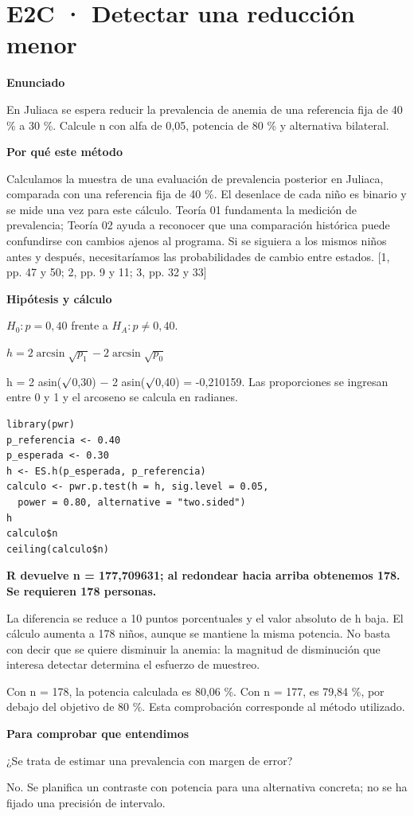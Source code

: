 \documentclass[10pt,a4paper]{article}
\newcommand{\etiqueta}[1]{\par{\bfseries\color{Blue}#1}\par}
\newcommand{\cajares}[1]{\par\colorbox{Pale}{\parbox{\dimexpr\linewidth-2\fboxsep}{\vspace{4pt}\textbf{\color{Navy}#1}\vspace{4pt}}}\par}
\begin{document}
\section*{E2C · Detectar una reducción menor}
\etiqueta{Enunciado}
En Juliaca se espera reducir la prevalencia de anemia de una referencia fija de 40 \% a 30 \%. Calcule n con alfa de 0,05, potencia de 80 \% y alternativa bilateral.
\etiqueta{Por qué este método}
Calculamos la muestra de una evaluación de prevalencia posterior en Juliaca, comparada con una referencia fija de 40 \%. El desenlace de cada niño es binario y se mide una vez para este cálculo. Teoría 01 fundamenta la medición de prevalencia; Teoría 02 ayuda a reconocer que una comparación histórica puede confundirse con cambios ajenos al programa. Si se siguiera a los mismos niños antes y después, necesitaríamos las probabilidades de cambio entre estados. [1, pp. 47 y 50; 2, pp. 9 y 11; 3, pp. 32 y 33]
\etiqueta{Hipótesis y cálculo}
$H_0:p=0{,}40$ frente a $H_A:p\ne0{,}40$.

$h=2\arcsin\sqrt{p_1}-2\arcsin\sqrt{p_0}$

h = 2 asin(\ensuremath{\surd}0,30) \ensuremath{-} 2 asin(\ensuremath{\surd}0,40) = -0,210159. Las proporciones se ingresan entre 0 y 1 y el arcoseno se calcula en radianes.
\begin{Verbatim}
library(pwr)
p_referencia <- 0.40
p_esperada <- 0.30
h <- ES.h(p_esperada, p_referencia)
calculo <- pwr.p.test(h = h, sig.level = 0.05,
  power = 0.80, alternative = "two.sided")
h
calculo$n
ceiling(calculo$n)
\end{Verbatim}
\cajares{R devuelve n = 177,709631; al redondear hacia arriba obtenemos 178. Se requieren 178 personas.}
La diferencia se reduce a 10 puntos porcentuales y el valor absoluto de h baja. El cálculo aumenta a 178 niños, aunque se mantiene la misma potencia. No basta con decir que se quiere disminuir la anemia: la magnitud de disminución que interesa detectar determina el esfuerzo de muestreo.

{\small\color{Gray}Con n = 178, la potencia calculada es 80,06 \%. Con n = 177, es 79,84 \%, por debajo del objetivo de 80 \%. Esta comprobación corresponde al método utilizado.}
\etiqueta{Para comprobar que entendimos}
¿Se trata de estimar una prevalencia con margen de error?

{\small No. Se planifica un contraste con potencia para una alternativa concreta; no se ha fijado una precisión de intervalo.}
\clearpage
\end{document}
